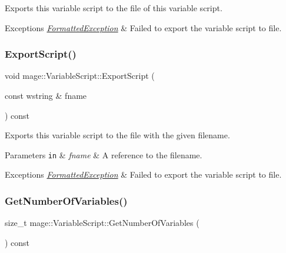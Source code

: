 Exports this variable script to the file of this variable script.


\begin{DoxyExceptions}{Exceptions}
{\em \hyperlink{classmage_1_1_formatted_exception}{Formatted\+Exception}} & Failed to export the variable script to file. \\
\hline
\end{DoxyExceptions}
\hypertarget{classmage_1_1_variable_script_a05ce2bcc72418422a443bcd8eff23486}{}\label{classmage_1_1_variable_script_a05ce2bcc72418422a443bcd8eff23486} 
\subsubsection{\texorpdfstring{Export\+Script()}{ExportScript()}\hspace{0.1cm}{\footnotesize\ttfamily [2/2]}}
{\footnotesize\ttfamily void mage\+::\+Variable\+Script\+::\+Export\+Script (\begin{DoxyParamCaption}\item[{const wstring \&}]{fname }\end{DoxyParamCaption}) const}

Exports this variable script to the file with the given filename.


\begin{DoxyParams}[1]{Parameters}
\mbox{\tt in}  & {\em fname} & A reference to the filename. \\
\hline
\end{DoxyParams}

\begin{DoxyExceptions}{Exceptions}
{\em \hyperlink{classmage_1_1_formatted_exception}{Formatted\+Exception}} & Failed to export the variable script to file. \\
\hline
\end{DoxyExceptions}
\hypertarget{classmage_1_1_variable_script_aea9aaa1659bceca4d22b9ab4ba4aba7a}{}\label{classmage_1_1_variable_script_aea9aaa1659bceca4d22b9ab4ba4aba7a} 
\subsubsection{\texorpdfstring{Get\+Number\+Of\+Variables()}{GetNumberOfVariables()}}
{\footnotesize\ttfamily size\+\_\+t mage\+::\+Variable\+Script\+::\+Get\+Number\+Of\+Variables (\begin{DoxyParamCaption}{ }\end{DoxyParamCaption}) const\hspace{0.3cm}{\ttfamily [noexcept]}}

